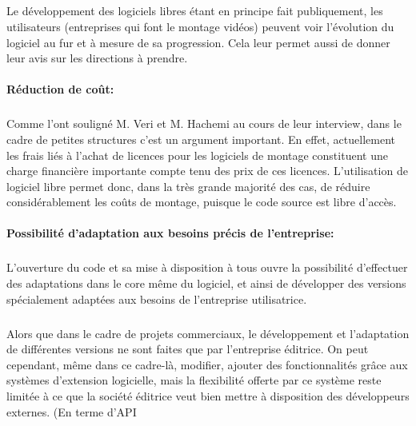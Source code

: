   \subparagraph{}

  Le développement des logiciels libres étant en principe fait
  publiquement, les utilisateurs (entreprises qui font le montage
  vidéos) peuvent voir l'évolution du logiciel au fur et à mesure
  de sa progression. Cela leur permet aussi de donner leur avis sur
  les directions à prendre.

\paragraph{Réduction de coût:}

\subparagraph{}

Comme l'ont souligné  M. Veri et M. Hachemi au cours de
leur interview, dans le cadre de petites structures c'est un
argument important.  En effet,  actuellement les frais liés à
l'achat de licences pour les logiciels de montage constituent
une charge financière importante compte tenu des prix de ces
licences. L'utilisation de logiciel libre permet donc, dans la très
grande majorité des cas, de réduire considérablement les coûts
de montage, puisque le code source est libre d'accès.

\paragraph{Possibilité d'adaptation aux besoins précis de
l'entreprise:}

\subparagraph{}

L'ouverture du code et sa mise à disposition à tous ouvre
la possibilité d'effectuer des adaptations dans le core même
du logiciel, et ainsi de développer des versions spécialement
adaptées aux besoins de l'entreprise utilisatrice.

\subparagraph{}

Alors que dans le cadre de projets commerciaux,  le développement
et l'adaptation de différentes versions ne sont faites que par
l'entreprise éditrice. On peut cependant, même dans ce cadre-là,
modifier, ajouter des fonctionnalités grâce aux systèmes
d'extension logicielle, mais la flexibilité offerte par ce système
reste limitée à ce que la société éditrice veut bien mettre à
disposition des développeurs externes. (En terme d'API 
